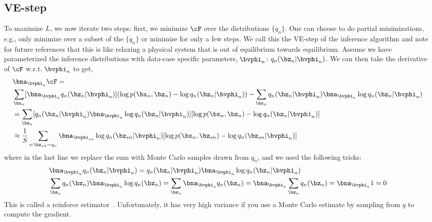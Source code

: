 \documentclass{lecture}
\begin{document}
\subsection{VE-step}
To maximize $L$, we now iterate two steps: first, we minimize $\cF$ over the distributions $\{q_n\}$. One can choose to do partial minimizations, e.g., only minimize over a subset of the $\{q_n\}$ or minimize for only a few steps. We call this the VE-step of the inference algorithm and note for future references that this is like relaxing a physical system that is out of equilibrium towards equilibrium. Assume we have parameterized the inference distributions with data-case specific parameters, $\bvphi_n$: $q_n(\bz_n|\bvphi_n)$. We can then take the derivative of $\cF$ w.r.t. $\bvphi_n$ to get,
\begin{align}
	 &\bna_{\bvphi_n}\cF =\\
	 &\sum_{\bz_n} [\bna_{\bvphi_n}q_n(\bz_n|\bvphi_n)](\log p(\bx_n,\bz_n) - \log q_n(\bz_n|\bvphi_n)) - \sum_{\bz_n} q_n(\bz_n|\bvphi_n) \bna_{\bvphi_n}\log q_n(\bz_n|\bvphi_n)\\
	 &= \sum_{\bz_n} [q_n(\bz_n|\bvphi_n)\bna_{\bvphi_n}\log q_n(\bz_n|\bvphi_n)][\log p(\bx_n,\bz_n) - \log q_n(\bz_n|\bvphi_n)]\\
	 &\approx \frac{1}{S}\sum_{s:\bz_{sn}\sim q_n}\bna_{\bvphi_{sn}}\log q_n(\bz_{sn}|\bvphi_n)[\log p(\bx_n,\bz_{sn}) - \log q_n(\bz_{sn}|\bvphi_n)]
\end{align}
where in the last line we replace the sum with Monte Carlo samples drawn from $q_n$, and we used the following tricks:
\begin{align}
	 &\bna_{\bvphi_n}q_n(\bz_n|\bvphi_n) = q_n(\bz_n|\bvphi_n)\bna_{\bvphi_n}\log q_n(\bz_n|\bvphi_n)\\
	 &\sum_{\bz_n} q_n(\bz_n)\bna_{\bvphi_n}\log q_n(\bz_n) = \sum_{\bz_n} \bna_{\bvphi_n} q_n(\bz_n) = \bna_{\bvphi_n} \sum_{\bz_n}  q_n(\bz_n) = \bna_{\bvphi_n} 1 = 0
\end{align}
This is called a reinforce estimator~\cite{Williams1992Simple}. Unfortunately, it has very high variance if you use a Monte Carlo estimate by sampling from $q$ to compute the gradient.
\end{document}
